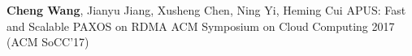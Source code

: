 \cvpub
{\textbf{Cheng Wang}, Jianyu Jiang, Xusheng Chen, Ning Yi, Heming Cui} %
{APUS: Fast and Scalable PAXOS on RDMA} %
{} %
{} %
{ %
ACM Symposium on Cloud Computing 2017 (ACM SoCC'17)\newline
}
